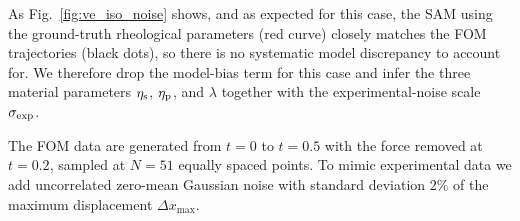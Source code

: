 



As Fig.~\ref{fig:ve_iso_noise} shows, and as expected for this case, the SAM
using the ground-truth rheological parameters (red curve) closely matches the
FOM trajectories (black dots), so there is no systematic model discrepancy to
account for. We therefore drop the model-bias term for this case and infer the
three material parameters $\eta_{\rm s}$, $\eta_{\rm p}$, and $\lambda$ together
with the experimental-noise scale $\sigma_{\rm exp}$.


The FOM data are generated from $t=0$ to $t=0.5$ with the force removed at
$t=0.2$, sampled at $N=51$ equally spaced points. To mimic experimental data we
add uncorrelated zero-mean Gaussian noise with standard deviation $2\%$ of the
maximum displacement $\Delta x_{\max}$.

